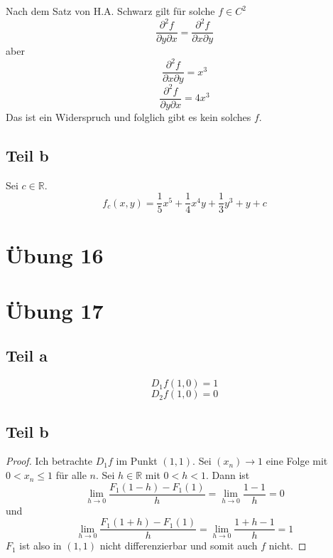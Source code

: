 \documentclass[10pt,a4paper]{article}
\begin{document}
Nach dem Satz von H.A. Schwarz gilt für solche $f \in C^{2}$
\begin{equation}
\frac{\partial^{2} f}{\partial y \partial x} = \frac{\partial^{2} f}{\partial x \partial y}
\end{equation}
aber
\begin{equation}
\frac{\partial^{2} f}{\partial x \partial y} = x^{3}
\end{equation}
\begin{equation}
\frac{\partial^{2} f}{\partial y \partial x} = 4x^{3}
\end{equation}
Das ist ein Widerspruch und folglich gibt es kein solches $f$.

\subsection*{Teil b}

Sei $c \in \mathbb{R}$.
\begin{equation}
f_{c}(x, y) = \frac{1}{5}x^{5} + \frac{1}{4}x^{4}y + \frac{1}{3}y^{3} + y + c
\end{equation}

\section*{Übung 16}

\section*{Übung 17}

\subsection*{Teil a}

\begin{equation}
D_{1} f(1, 0) = 1
\end{equation}
\begin{equation}
D_{2} f(1, 0) = 0
\end{equation}

\subsection*{Teil b}

\begin{proof}
Ich betrachte $D_{1}f$ im Punkt $(1, 1)$.
Sei $(x_{n}) \rightarrow 1$ eine Folge mit $0 < x_{n} \le 1$ für alle $n$.
Sei $h \in \mathbb{R}$ mit $0 < h < 1$.
Dann ist
\begin{equation}
\lim_{h \rightarrow 0} \frac{F_{1}(1 - h) - F_{1}(1)}{h} = \lim_{h \rightarrow 0} \frac{1 - 1}{h} = 0
\end{equation}
und
\begin{equation}
\lim_{h \rightarrow 0} \frac{F_{1}(1 + h) - F_{1}(1)}{h} = \lim_{h \rightarrow 0} \frac{1 + h - 1}{h} = 1
\end{equation}
$F_{1}$ ist also in $(1, 1)$ nicht differenzierbar und somit auch $f$ nicht.
\end{proof}
\end{document}
